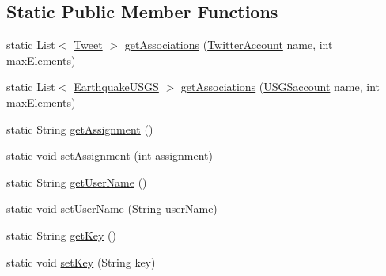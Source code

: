 \subsection*{Static Public Member Functions}
\begin{DoxyCompactItemize}
\item 
static List$<$ \hyperlink{classbridges_1_1data__src__dependent_1_1_tweet}{Tweet} $>$ \hyperlink{classbridges_1_1connect_1_1_bridges_ad8f145f95222730fad3c0628b42f0128}{get\+Associations} (\hyperlink{classbridges_1_1data__src__dependent_1_1_twitter_account}{Twitter\+Account} name, int max\+Elements)
\item 
static List$<$ \hyperlink{classbridges_1_1data__src__dependent_1_1_earthquake_u_s_g_s}{Earthquake\+U\+S\+GS} $>$ \hyperlink{classbridges_1_1connect_1_1_bridges_ac02211d6205c1270df11fcc271982d40}{get\+Associations} (\hyperlink{classbridges_1_1data__src__dependent_1_1_u_s_g_saccount}{U\+S\+G\+Saccount} name, int max\+Elements)
\item 
static String \hyperlink{classbridges_1_1connect_1_1_bridges_ae488b9bf0d696adb7f5a6ba7ce4ff2fd}{get\+Assignment} ()
\item 
static void \hyperlink{classbridges_1_1connect_1_1_bridges_a24c91901a59ab8b715a864ab8a4d9cdc}{set\+Assignment} (int assignment)
\item 
static String \hyperlink{classbridges_1_1connect_1_1_bridges_a5ff3fdd97d4c71c9c2141c3355e417aa}{get\+User\+Name} ()
\item 
static void \hyperlink{classbridges_1_1connect_1_1_bridges_a2d84103645662308e58a1b473d3320ae}{set\+User\+Name} (String user\+Name)
\item 
static String \hyperlink{classbridges_1_1connect_1_1_bridges_a813a1783f7b547fdb964f8af87c66f4b}{get\+Key} ()
\item 
static void \hyperlink{classbridges_1_1connect_1_1_bridges_a484992ce3fce273ca2caa215a4488e3c}{set\+Key} (String key)
\end{DoxyCompactItemize}
